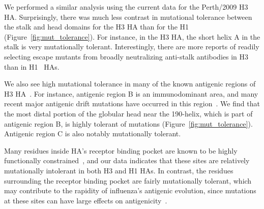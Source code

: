 \documentclass[9pt,twocolumn,twoside]{pnas-new}
\begin{document}
We performed a similar analysis using the current data for the Perth/2009 H3 HA.
Surprisingly, there was much less contrast in mutational tolerance between the stalk and head domains for the H3 HA than for the H1 (Figure~\ref{fig:mut_tolerance}).
For instance, in the H3 HA, the short helix A in the stalk is very mutationally tolerant.
Interestingly, there are more reports of readily selecting escape mutants from broadly neutralizing anti-stalk antibodies in H3~\cite{ekiert2011highly, friesen2014common, chai2016two, yamayoshi2017human} than in H1~\cite{okuno1993common,doud2017quantifying,anderson2017natural} HAs.

We also see high mutational tolerance in many of the known antigenic regions of H3 HA~\cite{wiley1981structural}.
For instance, antigenic region B is an immunodominant area, and many recent major antigenic drift mutations have occurred in this region~\cite{chambers2015identification,koel2013substitutions,popova2012immunodominance}.
We find that the most distal portion of the globular head near the 190-helix, which is part of antigenic region B, is highly tolerant of mutations (Figure~\ref{fig:mut_tolerance}).
Antigenic region C is also notably mutationally tolerant.

Many residues inside HA's receptor binding pocket are known to be highly functionally constrained~\cite{wilson1981structure,martin1998studies}, and our data indicates that these sites are relatively mutationally intolerant in both H3 and H1 HAs.
In contrast, the residues surrounding the receptor binding pocket are fairly mutationally tolerant, which may contribute to the rapidity of influenza's antigenic evolution, since mutations at these sites can have large effects on antigenicity~\cite{wiley1981structural,koel2013substitutions}.
\end{document}
